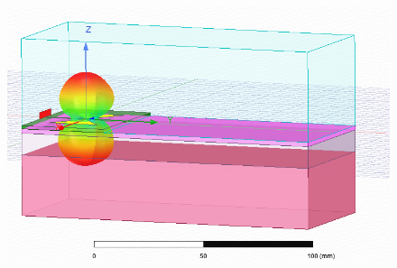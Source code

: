 \documentclass[10pt, a4paper]{article}%
\begin{document}
\begin{figure}[ht!]
\begin{minipage}{0.32\textwidth}
	\end{minipage}
	\hfill
	\begin{minipage}{0.32\textwidth}
		\centering
		\includegraphics[width= 1\textwidth,height = 0.25\textheight]{3D_model_GHz.png}
	\end{minipage}
	\end{figure}
\end{document}
